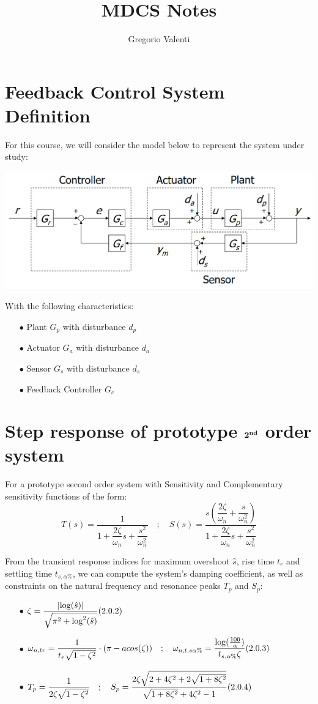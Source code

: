 \documentclass{article}
\title{MDCS Notes}
\author{Gregorio Valenti}
\date{}
\numberwithin{equation}{subsection}
\begin{document}
	\section{Feedback Control System Definition}
	\hspace{1cm}
	For this course, we will consider the model below to represent the system under study:
	
	\includegraphics[scale=1]{images/feedback_loop_description.png}

	With the following characteristics:
	\begin{enumerate}
		\item[$\bullet$] Plant $G_p$ with disturbance $d_p$
		\item[$\bullet$] Actuator $G_a$ with disturbance $d_a$
		\item[$\bullet$] Sensor $G_s$ with disturbance $d_s$
		\item[$\bullet$] Feedback Controller $G_c$ 	
	\end{enumerate}
	
	\section{Step response of prototype $\boldmath{2}^{\textbf{nd}}$ order system}
	For a prototype second order system with Sensitivity and Complementary sensitivity functions of the form:
	\begin{equation}
		T(s) = \dfrac{1}{1+\dfrac{2\zeta}{\omega_n}s+\dfrac{s^2}{\omega_n^2}} \quad ; \quad S(s) = \dfrac{s\left(\dfrac{2\zeta}{\omega_n}+\dfrac{s}{\omega_n^2}\right)}{1+\dfrac{2\zeta}{\omega_n}s+\dfrac{s^2}{\omega_n^2}}
	\end{equation}
	
	
	From the transient response indices for maximum overshoot $\hat{s}$, rise time $t_r$ and settling time $t_{s,\alpha\%}$, we can compute the system's damping coefficient, as well as constraints on the natural frequency and resonance peaks $T_p$ and $S_p$:
	\begin{enumerate}
		\item[$\bullet$] $\displaystyle \zeta = \frac{\left| \log (\hat{s}) \right|}{\sqrt{\pi^2 + \log^2 (\hat{s})}} \hfill (2.0.2)$
		\item[$\bullet$] $\displaystyle \omega_{n,tr} = \frac{1}{t_r\sqrt{1-\zeta^2}} \cdot (\pi - acos(\zeta)) \quad; \quad
		\omega_{n,t,s\alpha \%} = \frac{\log(\frac{100}{\alpha})}{t_{s,\alpha \%}\zeta} \hfill (2.0.3)$
		\item[$\bullet$] $\displaystyle T_p = \frac{1}{2\zeta \sqrt{1-\zeta^2}} \quad; \quad S_p = \frac{2\zeta \sqrt{2+4\zeta^2+2\sqrt{1+8\zeta^2}}}{\sqrt{1+8\zeta^2}+4\zeta^2-1} \hfill (2.0.4)$
	\end{enumerate}
	
\end{document}
